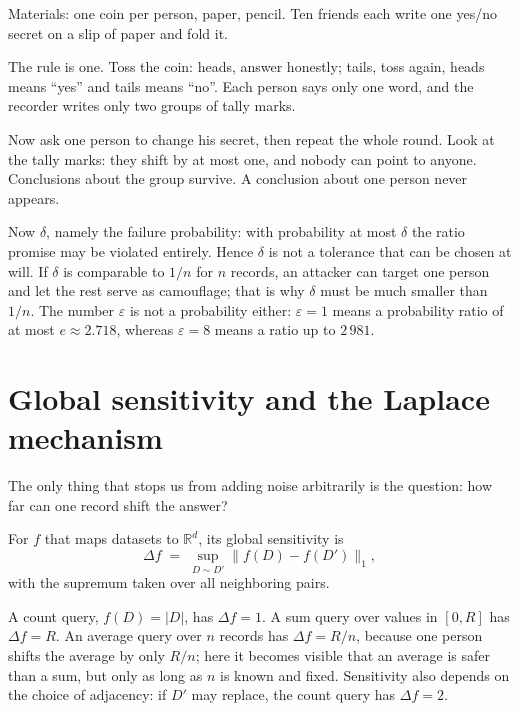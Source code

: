 \begin{tangan}
Materials: one coin per person, paper, pencil. Ten friends each write one yes/no secret
on a slip of paper and fold it.

The rule is one. Toss the coin: heads, answer honestly; tails, toss again, heads means
``yes'' and tails means ``no''. Each person says only one word, and the recorder writes
only two groups of tally marks.

Now ask one person to change his secret, then repeat the whole round. Look at the tally
marks: they shift by at most one, and nobody can point to anyone. Conclusions about the
group survive. A conclusion about one person never appears.
\end{tangan}

Now $\delta$, namely the failure probability: with probability at most $\delta$ the ratio
promise may be violated entirely. Hence $\delta$ is not a tolerance that can be chosen at
will. If $\delta$ is comparable to $1/n$ for $n$ records, an attacker can target one
person and let the rest serve as camouflage; that is why $\delta$ must be much smaller
than $1/n$. The number $\varepsilon$ is not a probability either: $\varepsilon=1$ means a
probability ratio of at most $e\approx 2.718$, whereas $\varepsilon=8$ means a ratio up to
$2\,981$.

\section{Global sensitivity and the Laplace mechanism}

The only thing that stops us from adding noise arbitrarily is the question: how far can
one record shift the answer?

\begin{definisi}
For $f$ that maps datasets to $\mathbb{R}^d$, its global sensitivity is
\begin{equation}
\Delta f \;=\; \sup_{D\sim D'} \bigl\| f(D)-f(D') \bigr\|_{1},
\end{equation}
with the supremum taken over all neighboring pairs.
\end{definisi}

A count query, $f(D)=|D|$, has $\Delta f=1$. A sum query over values in $[0,R]$ has
$\Delta f=R$. An average query over $n$ records has $\Delta f=R/n$, because one person
shifts the average by only $R/n$; here it becomes visible that an average is safer than a
sum, but only as long as $n$ is known and fixed. Sensitivity also depends on the choice
of adjacency: if $D'$ may replace, the count query has $\Delta f=2$.

